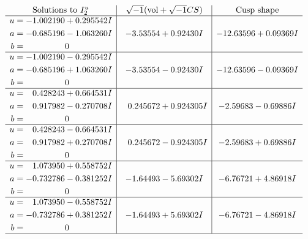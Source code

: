 \documentclass[1p]{elsarticle_modified}
\theoremstyle{definition}
\newcommand{\I}{\sqrt{-1}}
\begin{document}
$$\begin{array}{c|c|c}  
\text{Solutions to }I^u_{2}& \I (\text{vol} + \sqrt{-1}CS) & \text{Cusp shape}\\
 \hline 
\begin{aligned}
u &= -1.002190 + 0.295542 I \\
a &= -0.685196 - 1.063260 I \\
b &= \phantom{-0.000000 } 0\end{aligned}
 & -3.53554 + 0.92430 I & -12.63596 + 0.09369 I \\ \hline\begin{aligned}
u &= -1.002190 - 0.295542 I \\
a &= -0.685196 + 1.063260 I \\
b &= \phantom{-0.000000 } 0\end{aligned}
 & -3.53554 - 0.92430 I & -12.63596 - 0.09369 I \\ \hline\begin{aligned}
u &= \phantom{-}0.428243 + 0.664531 I \\
a &= \phantom{-}0.917982 - 0.270708 I \\
b &= \phantom{-0.000000 } 0\end{aligned}
 & \phantom{-}0.245672 + 0.924305 I & -2.59683 - 0.69886 I \\ \hline\begin{aligned}
u &= \phantom{-}0.428243 - 0.664531 I \\
a &= \phantom{-}0.917982 + 0.270708 I \\
b &= \phantom{-0.000000 } 0\end{aligned}
 & \phantom{-}0.245672 - 0.924305 I & -2.59683 + 0.69886 I \\ \hline\begin{aligned}
u &= \phantom{-}1.073950 + 0.558752 I \\
a &= -0.732786 - 0.381252 I \\
b &= \phantom{-0.000000 } 0\end{aligned}
 & -1.64493 - 5.69302 I & -6.76721 + 4.86918 I \\ \hline\begin{aligned}
u &= \phantom{-}1.073950 - 0.558752 I \\
a &= -0.732786 + 0.381252 I \\
b &= \phantom{-0.000000 } 0\end{aligned}
 & -1.64493 + 5.69302 I & -6.76721 - 4.86918 I\\
 \hline 
 \end{array}$$\newpage
\newpage\renewcommand{\arraystretch}{1}
\end{document}
